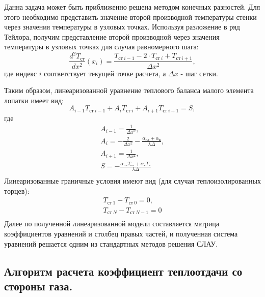 \documentclass[a4paper,10pt]{article}
\begin{document}
    Данна задача может быть приближенно решена методом конечных разностей.
    Для этого необходимо представить значение второй производной температуры стенки через значения температуры в
    узловых точках.
    Используя разложение в ряд Тейлора, получим представление второй производной через значения температуры в
    узловых точках для случая равномерного шага:
    \[
        \frac{d^2 T_{ст}}{dx^2}(x_i) = \frac{T_{ст\ i-1} - 2 \cdot T_{ст\ i} + T_{ст\ i+1}}{\Delta x^2},
    \]
    где индекс $i$ соответствует текущей точке расчета, а $\Delta x$ - шаг сетки.

    Таким образом, линеаризованной уравнение теплового баланса малого элемента лопатки имеет вид:
    \[
        A_{i-1} T_{ст\ i-1} + A_{i} T_{ст\ i} + A_{i+1} T_{ст\ i+1} = S,
    \]
    где
    \begin{gather*}
        A_{i-1} = \frac{1}{\Delta x^2},\\
        A_i = -\frac{2}{\Delta x^2} - \frac{\alpha_{пл} + \alpha_в}{\lambda \Delta},\\
        A_{i+1} =\frac{1}{\Delta x^2},\\
        S = - \frac{\alpha_{пл} T_{пл} + \alpha_в T_в}{\lambda \Delta}\\
    \end{gather*}
    Линеаризованные граничные условия имеют вид (для случая теплоизолированных торцев):
    \begin{gather*}
        T_{ст\ 1} - T_{ст\ 0} = 0,\\
        T_{ст\ N} - T_{ст\ N-1} = 0\\
    \end{gather*}
    Далее по полученной линеаризованной модели составляется матрица коэффициентов уравнений и столбец правых частей,
    и полученная система уравнений решается одним из стандартных методов решения СЛАУ.

%    

    \subsection{Алгоритм расчета коэффициент теплоотдачи со стороны газа.}
\end{document}
